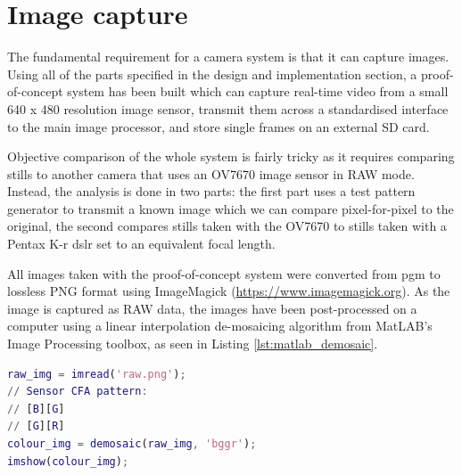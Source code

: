 \section{Image capture}
The fundamental requirement for a camera system is that it can capture images. Using all of the parts specified in the design and implementation section, a proof-of-concept system has been built which can capture real-time video from a small 640 x 480 resolution image sensor, transmit them across a standardised interface to the main image processor, and store single frames on an external SD card.

Objective comparison of the whole system is fairly tricky as it requires comparing stills to another camera that uses an OV7670 image sensor in RAW mode. Instead, the analysis is done in two parts: the first part uses a test pattern generator to transmit a known image which we can compare pixel-for-pixel to the original, the second compares stills taken with the OV7670 to stills taken with a Pentax K-r \gls{dslr} set to an equivalent focal length.

All images taken with the proof-of-concept system were converted from \gls{pgm} to lossless PNG format using ImageMagick (\url{https://www.imagemagick.org}). As the image is captured as RAW data, the images have been post-processed on a computer using a linear interpolation de-mosaicing algorithm from MatLAB's Image Processing toolbox, as seen in Listing \ref{lst:matlab_demosaic}.

\begin{lstlisting}[caption={MatLAB's linear interpolation demosaicing algorithm.}, label={matlab_demosaic}, language=Matlab]
raw_img = imread('raw.png');
// Sensor CFA pattern:
// [B][G]
// [G][R]
colour_img = demosaic(raw_img, 'bggr');
imshow(colour_img);
\end{lstlisting}


